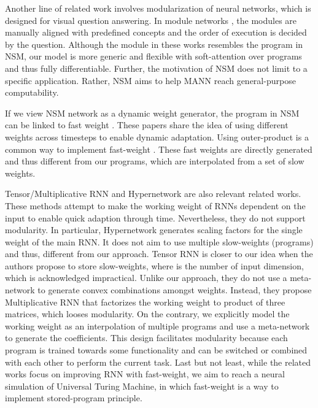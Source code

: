 \documentclass[english]{article}
\renewcommand{\cite}{\citep}
\begin{document}
Another line of related work involves modularization of neural networks,
which is designed for visual question answering. In module networks
\cite{andreas2016neural,andreas-etal-2016-learning}, the modules
are manually aligned with predefined concepts and the order of execution
is decided by the question. Although the module in these works resembles
the program in NSM, our model is more generic and flexible with soft-attention
over programs and thus fully differentiable. Further, the motivation
of NSM does not limit to a specific application. Rather, NSM aims
to help MANN reach general-purpose computability. 

If we view NSM network as a dynamic weight generator, the program
in NSM can be linked to fast weight \cite{cogprints1380,hinton1987using,schmidhuber1993self}.
These papers share the idea of using different weights across timesteps
to enable dynamic adaptation. Using outer-product is a common way
to implement fast-weight \cite{schmidhuber1993reducing,ba2016using,schlag2017gated}.
These fast weights are directly generated and thus different from
our programs, which are interpolated from a set of slow weights. 

Tensor/Multiplicative RNN \cite{sutskever2011generating} and Hypernetwork
\cite{ha2016hypernetworks} are also relevant related works. These
methods attempt to make the working weight of RNNs dependent on the
input to enable quick adaption through time. Nevertheless, they do
not support modularity. In particular, Hypernetwork generates scaling
factors for the single weight of the main RNN. It does not aim to
use multiple slow-weights (programs) and thus, different from our
approach. Tensor RNN is closer to our idea when the authors propose
to store  slow-weights, where  is the number of input dimension,
which is acknowledged impractical. Unlike our approach, they do not
use a meta-network to generate convex combinations amongst weights.
Instead, they propose Multiplicative RNN that factorizes the working
weight to product of three matrices, which looses modularity. On the
contrary, we explicitly model the working weight as an interpolation
of multiple programs and use a meta-network to generate the coefficients.
This design facilitates modularity because each program is trained
towards some functionality and can be switched or combined with each
other to perform the current task. Last but not least, while the related
works focus on improving RNN with fast-weight, we aim to reach a neural
simulation of Universal Turing Machine, in which fast-weight is a
way to implement stored-program principle. 
 
\end{document}

